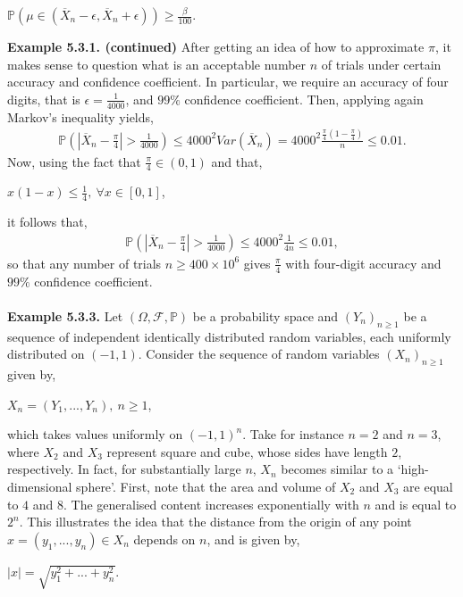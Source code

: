 \documentclass{article}
\begin{document}
\begin{center}
	$\mathbb{P}(\mu \in (\overline{X}_{n} - \epsilon, \overline{X}_{n} + \epsilon)) \geq \frac{\beta}{100}$. 
\end{center}
\textbf{Example 5.3.1. (continued)} After getting an idea of how to approximate $\pi$, it makes sense to question what is an acceptable number $n$ of trials under certain accuracy and confidence coefficient. In particular, we require an accuracy of four digits, that is $\epsilon = \frac{1}{4000}$, and $99\%$ confidence coefficient. Then, applying again Markov's inequality yields,
\begin{eqnarray}
\nonumber
\mathbb{P}\left(\left|\overline{X}_n - \frac{\pi}{4}\right| > \frac{1}{4000}\right) \leq 4000^2 Var(\overline{X}_n) = 4000^2\frac{\frac{\pi}{4}(1-\frac{\pi}{4})}{n} \leq 0.01.
\end{eqnarray}
Now, using the fact that $\frac{\pi}{4}\in(0,1)$ and that,
\begin{center}
	$x(1-x) \leq \frac{1}{4}, \ \forall x \in [0,1]$,
\end{center}
it follows that,
\begin{eqnarray}
\nonumber
\mathbb{P}\left(\left|\overline{X}_n - \frac{\pi}{4}\right| > \frac{1}{4000}\right) \leq 4000^2\frac{1}{4n} \leq 0.01,
\end{eqnarray}
so that any number of trials $n \geq 400\times10^6$ gives $\frac{\pi}{4}$ with four-digit accuracy and $99\%$ confidence coefficient.\\\\
\textbf{Example 5.3.3.} Let $(\Omega,\mathcal{F},\mathbb{P})$ be a probability space and $(Y_n)_{n\geq1}$ be a sequence of independent identically distributed random variables, each uniformly distributed on $(-1,1)$. Consider the sequence of random variables $(X_n)_{n\geq1}$ given by,
\begin{center}
	$X_n = (Y_1,...,Y_n), \ n\geq1$,
\end{center}
which takes values uniformly on $(-1,1)^n$. Take for instance $n=2$ and $n=3$, where $X_2$ and $X_3$ represent square and cube, whose sides have length $2$, respectively. In fact, for substantially large $n$, $X_n$ becomes similar to a ‘high-dimensional sphere’. First, note that the area and volume of $X_2$ and $X_3$ are equal to $4$ and $8$. The generalised content increases exponentially with $n$ and is equal to $2^n$. This illustrates the idea that the distance from the origin of any point $x = (y_1,...,y_n) \in X_n$ depends on $n$, and is given by,
\begin{center}
	$|x| = \sqrt{y_1^2 + ... + y_n^2}$.
\end{center}
\end{document}
